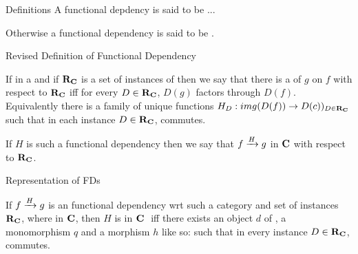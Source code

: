 \begin{frame}{Definitions}
A functional depdency is said to be  ...

Otherwise a functional dependency is said to be .
\end{frame}


\begin{frame}{Revised Definition of Functional Dependency}
\begin{definition}
If \scalebox{0.9}{\fgsourcediagram} in a \catMEterm \catcw  and if $\reqtc$ is a set of instances of \catcw
then we say that there is a   of $g$ on $f$ with respect to $\reqtc$ iff
for every $D \in \reqtc$, $D(g)$ factors through $D(f)$. \\
\medskip
Equivalently there is a family of unique functions $H_D:img(D(f)) \morph D(c))_{D \in \reqtc}$
such that in each instance $D \in \reqtc$,
 commutes.
\end{definition}

If $H$ is such a functional dependency then we say that $\fundep{H}{f}{g}$ in $\catc$ with respect to $\reqtc$.
\end{frame}

\begin{frame}{Representation of FDs}
\begin{definition}
If $\fundep{H}{f}{g}$ is an   functional dependency wrt such a category \catcw and set of instances $\reqtc$, 
where \scalebox{0.9}{\roomdown{0.8cm}\fgsourcediagram} in $\catc$, 
then $H$  is  in $\catcw$ 
iff there exists an object $d$ of \catc, a monomorphism $q$ and a morphism $h$
like so:
such that in every instance $D \in \reqtc$,
 commutes.
\end{definition}
\end{frame}


